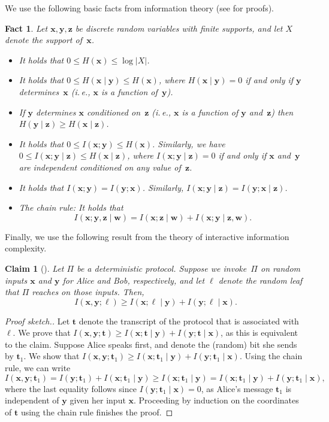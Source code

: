 \documentclass[11pt]{article}
\numberwithin{equation}{section}
\newtheorem{claim}[theorem]{Claim}
\newtheorem{fact}[theorem]{Fact}
\theoremstyle{definition}
\theoremstyle{plain}
\newcommand{\ie}{i.\,e.}
\theoremstyle{definition}\newtheorem{notation}[theorem]{Notation}\theoremstyle{plain}
\newcommand{\bl}{\boldsymbol{\ell}}
\newcommand{\x}{\boldsymbol{x}}
\newcommand{\y}{\boldsymbol{y}}
\newcommand{\z}{\boldsymbol{z}}
\newcommand{\w}{\boldsymbol{w}}
\theoremstyle{definition}
\theoremstyle{plain}
\begin{document}
We use the following basic facts from information theory (see \cite{CT91}
for proofs). 
\begin{fact}
\label{fact:information-properties}Let $\x,\y,\z$ be discrete random
variables with finite supports, and let $X$ denote the support of~$\x$. 
\begin{itemize}
\item It holds that $0\le H(\x)\le\log\left|X\right|$. 
\item It holds that $0\le H(\x\mid\y)\le H(\x)$, where $H(\x\mid\y)=0$
if and only if $\y$ determines~$\x$ (\ie, $\x$ is a function
of~$\y$). 
\item If $\y$ determines $\x$ conditioned on~$\z$ (\ie, $\x$ is a
function of $\y$ and~$\z$) then $H(\y\mid\z)\ge H(\x\mid\z)$. 
\item It holds that $0\le I(\x;\y)\le H(\x)$. Similarly, we have
$0\le I(\x;\y\mid\z)\le H(\x\mid\z)$, where $I(\x;\y\mid\z)=0$ if
and only if $\x$ and~$\y$ are independent conditioned on any value
of~$\z$. 
\item It holds that $I(\x;\y)=I(\y;\x)$. Similarly, $I(\x;\y\mid\z)=I(\y;\x\mid\z)$. 
\item \emph{The chain rule:} It holds that 
\[
I(\x;\y,\z\mid\w)=I(\x;\z\mid\w)+I(\x;\y\mid\z,\w).
\]
\end{itemize}
\end{fact}

Finally, we use the following result from the theory of interactive
information complexity. 
\begin{claim}[{{\cite[Fact 4.15]{BBCR13}}}]
\label{claim:internal-vs-external-information}Let $\Pi$ be a deterministic
protocol. Suppose we invoke~$\Pi$ on random inputs $\x$ and $\y$
for Alice and Bob, respectively, and let $\bl$ denote the random
leaf that $\Pi$ reaches on those inputs. Then, 
\[
I(\x,\y;\bl)\ge I(\x;\bl\mid\y)+I(\y;\bl\mid\x).
\]
\end{claim}

\begin{proof}[Proof sketch.]
Let $\boldsymbol{t}$ denote the transcript of the protocol that
is associated with~$\bl$. We prove that $I(\x,\y;\boldsymbol{t})\ge I(\x;\boldsymbol{t}\mid\y)+I(\y;\boldsymbol{t}\mid\x)$,
as this is equivalent to the claim. Suppose Alice speaks first, and
denote the (random) bit she sends by $\boldsymbol{t}_{1}$. We show
that $I(\x,\y;\boldsymbol{t}_{1})\ge I(\x;\boldsymbol{t}_{1}\mid\y)+I(\y;\boldsymbol{t}_{1}\mid\x)$.
Using the chain rule, we can write 
\[
I(\x,\y;\boldsymbol{t}_{1})=I(\y;\boldsymbol{t}_{1})+I(\x;\boldsymbol{t}_{1}\mid\y)\geq I(\x;\boldsymbol{t}_{1}\mid\y)=I(\x;\boldsymbol{t}_{1}\mid\y)+I(\y;\boldsymbol{t}_{1}\mid\x),
\]
where the last equality follows since $I(\y;\boldsymbol{t}_{1}\mid\x)=0$,
as Alice's message $\boldsymbol{t}_{1}$ is independent of $\y$ given
her input $\x$. Proceeding by induction on the coordinates of $\boldsymbol{t}$
using the chain rule finishes the proof. 
\end{proof}
\end{document}

